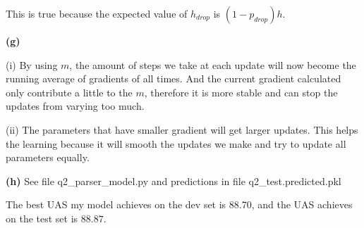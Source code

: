\documentclass[10pt, a4paper]{ctexart}
\begin{document}
This is true because the expected value of $h_{drop}$ is $(1-p_{drop})h$.\par
{\bf{(g)}}\par
{\hspace{10pt}}(i) By using $m$, the amount of steps we take at each update will now become the running average of gradients of all times. And the current gradient calculated only contribute a little to the $m$, therefore it is more stable and can stop the updates from varying too much.\par
{\hspace{10pt}}(ii) The parameters that have smaller gradient will get larger updates. This helps the learning because it will smooth the updates we make and try to update all parameters equally.\par
{\bf{(h)}} See file q2\_parser\_model.py and predictions in file q2\_test.predicted.pkl\par
The best UAS my model achieves on the dev set is $88.70$, and the UAS achieves on the test set is $88.87$.
\end{document}
